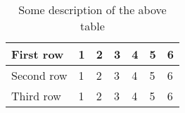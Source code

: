 \noindent %
\begin{table}[h]
  \begin{center}
    \begin{tabularx}{\textwidth}{ |X|X|X|X|X|X|X| }
      \hline
      First row & 1 & 2 & 3 & 4 & 5 & 6 \\
      \hline
      Second row & 1 & 2 & 3 & 4 & 5 & 6 \\ 
      \hline
      Third row & 1 & 2 & 3 & 4 & 5 & 6 \\  
      \hline
    \end{tabularx}
  \end{center}
  \vspace{-5mm}
  \caption{Some description of the above table}
  \label{table:y1-table1}
\end{table}